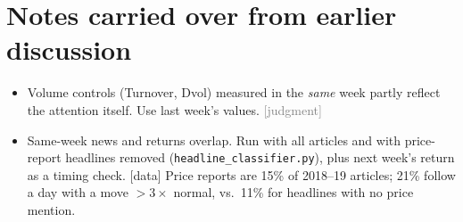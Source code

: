 \documentclass[11pt]{article}
\newcommand{\data}{\textcolor{NavyBlue}{\textsf{[data]}}}
\newcommand{\judg}{\textcolor{Gray}{\textsf{[judgment]}}}
\newcommand{\var}[1]{\texttt{#1}}
\begin{document}
\section{Notes carried over from earlier discussion}
\begin{itemize}
  \item Volume controls (Turnover, Dvol) measured in the \emph{same} week partly reflect the attention itself. Use last week's values. \judg{}
  \item Same-week news and returns overlap. Run with all articles and with price-report headlines removed (\var{headline\_classifier.py}), plus next week's return as a timing check. \data{} Price reports are 15\% of 2018--19 articles; 21\% follow a day with a move $>3\times$ normal, vs.\ 11\% for headlines with no price mention.
\end{itemize}
\end{document}
